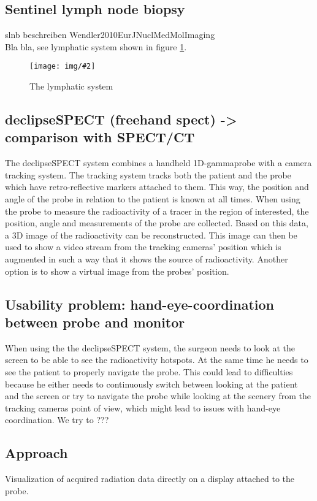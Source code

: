 \documentclass{scrartcl}
\newcommand{\red}[1]{{\color{red} #1}}
\newcommand{\graphic}[3][width=\linewidth] %
{
  \begin{figure}[ht]
    \centering
    \texttt{[image: img/\#2]}
    \caption{#3}
    \label{fig:#2}
  \end{figure}
}
\newcommand{\refFigure}[1]{figure \ref{fig:#1}}
\begin{document}
\subsection{Sentinel lymph node biopsy}
\red{slnb beschreiben Wendler2010EurJNuclMedMolImaging}\\
Bla bla, see lymphatic system shown in \refFigure{lymphatic-system}.
\graphic[scale=.7]{lymphatic-system}{The lymphatic system}


\subsection{declipseSPECT (freehand spect) -> comparison with SPECT/CT}
The declipseSPECT system combines a handheld 1D-gammaprobe with a camera tracking system. The tracking system tracks both the patient and the probe which have retro-reflective markers attached to them. This way, the position and angle of the probe in relation to the patient is known at all times. When using the probe to measure the radioactivity of a tracer in the region of interested, the position, angle and measurements of the probe are collected. Based on this data, a 3D image of the radioactivity can be reconstructed.
This image can then be used to show a video stream from the tracking cameras' position which is augmented in such a way that it shows the source of radioactivity. Another option is to show a virtual image from the probes' position.


\subsection{Usability problem: hand-eye-coordination between probe and monitor}
When using the the declipseSPECT system, the surgeon needs to look at the screen to be able to see the radioactivity hotspots. At the same time he needs to see the patient to properly navigate the probe. This could lead to difficulties because he either needs to continuously switch between looking at the patient and the screen or try to navigate the probe while looking at the scenery from the tracking cameras point of view, which might lead to issues with hand-eye coordination.
We try to ???


\subsection{Approach}
Visualization of acquired radiation data directly on a display attached to the probe.
\end{document}

